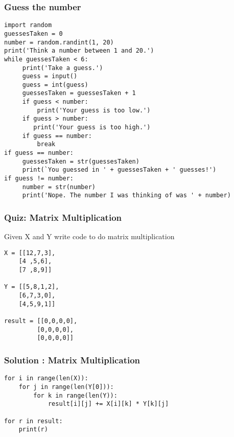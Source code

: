 \begin{frame}[fragile]\frametitle{Guess the number}
\begin{lstlisting}
import random
guessesTaken = 0
number = random.randint(1, 20)
print('Think a number between 1 and 20.')
while guessesTaken < 6:
     print('Take a guess.') 
     guess = input()
     guess = int(guess)
     guessesTaken = guessesTaken + 1
     if guess < number:
         print('Your guess is too low.') 
     if guess > number:
        print('Your guess is too high.')
     if guess == number:
         break
if guess == number:
     guessesTaken = str(guessesTaken)
     print(`You guessed in ' + guessesTaken + ' guesses!')
if guess != number:
     number = str(number)
     print('Nope. The number I was thinking of was ' + number)
\end{lstlisting}
\end{frame}

\begin{frame}[fragile]\frametitle{Quiz: Matrix Multiplication}
Given X and Y write code to do matrix multiplication
\begin{lstlisting}
X = [[12,7,3],
    [4 ,5,6],
    [7 ,8,9]]

Y = [[5,8,1,2],
    [6,7,3,0],
    [4,5,9,1]]

result = [[0,0,0,0],
         [0,0,0,0],
         [0,0,0,0]]
\end{lstlisting}

\end{frame}

\begin{frame}[fragile]\frametitle{Solution : Matrix Multiplication}

\begin{lstlisting}
for i in range(len(X)):
    for j in range(len(Y[0])):
        for k in range(len(Y)):
            result[i][j] += X[i][k] * Y[k][j]

for r in result:
    print(r)
\end{lstlisting}

\end{frame}
	
